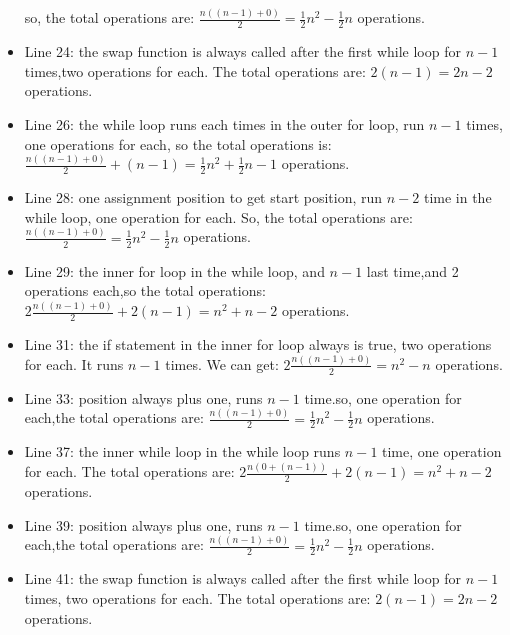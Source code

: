\documentclass[11pt]{article}
\begin{document}
\begin{itemize}
                   so, the total operations are: $\frac{n((n - 1) + 
                  0)}{2} = \frac{1}{2}n^{2}-\frac{1}{2}n$ operations.
 \item Line 24:  the swap function is always called after the first
                   while loop for $n - 1$ times,two operations for
                   each. The total operations are: $2(n - 1)
                   = 2n - 2$ operations.
  \item Line 26: the while loop runs each times in the outer for loop, 
                   run $n-1$ times, one operations for each, so the 
                   total operations is: $\frac{n((n-1) + 0)}{2} 
                   + (n - 1)= \frac{1}{2}n^{2} + \frac{1}{2}n - 1$ 
                   operations.
  \item Line 28: one assignment position to get start position, 
                   run $n - 2$ time in the while loop, one operation 
                   for each. So, the total operations are: 
                   $\frac{n((n - 1) + 0)}{2} = \frac{1}{2}n^{2}-
                   \frac{1}{2}n$ operations.
  \item Line 29: the inner for loop in the while loop, and $n - 1$ 
                  last time,and 2 operations each,so the total 
                  operations: $2\frac{n((n-1) + 0)}{2} + 2(n - 1)
                  = n^{2} + n - 2$ operations.
  \item Line 31: the if statement in the inner for loop always is 
                  true, two operations for each. It runs $n-1$ 
                  times. We can get: $2\frac{n((n-1) + 0)}{2} = 
                  n^{2} - n$ operations.
  \item Line 33: position always plus one, runs $n - 1$ time.so,
                  one operation for each,the total operations are: 
                  $\frac{n((n - 1) + 0)}{2} = \frac{1}{2}n^{2} -
                  \frac{1}{2}n$ operations.
  \item Line 37: the inner while loop in the while loop runs $n - 1$ 
                   time, one operation for each. The total operations 
                  are: $2\frac{n(0 + (n - 1))}{2}+2(n - 1) = n^{2}
                  + n - 2$ operations.
  \item Line 39: position always plus one, runs $n - 1$ time.so,
                  one operation for each,the total operations are: 
                  $\frac{n((n - 1) + 0)}{2} = \frac{1}{2}n^{2} -
                  \frac{1}{2}n$ operations. 
  \item Line 41: the swap function is always called after the first
                   while loop for $n - 1$ times, two operations for
                   each. The total operations are: $2(n - 1)
                   = 2n - 2$ operations.
\end{itemize}
\end{document}
